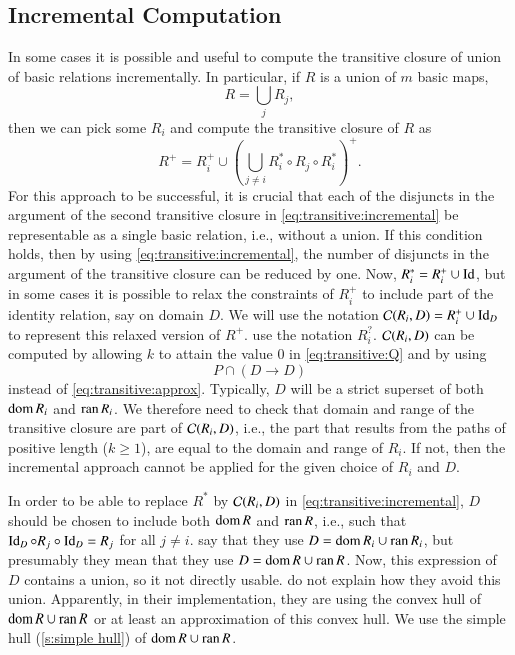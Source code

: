 \subsection{Incremental Computation}
\label{s:incremental}

In some cases it is possible and useful to compute the transitive closure
of union of basic relations incrementally.  In particular,
if $R$ is a union of $m$ basic maps,
$$
R = \bigcup_j R_j
,
$$
then we can pick some $R_i$ and compute the transitive closure of $R$ as
\begin{equation}
\label{eq:transitive:incremental}
R^+ = R_i^+ \cup
\left(
\bigcup_{j \ne i}
R_i^* \circ R_j \circ R_i^*
\right)^+
.
\end{equation}
For this approach to be successful, it is crucial that each
of the disjuncts in the argument of the second transitive
closure in \eqref{eq:transitive:incremental} be representable
as a single basic relation, i.e., without a union.
If this condition holds, then by using \eqref{eq:transitive:incremental},
the number of disjuncts in the argument of the transitive closure
can be reduced by one.
Now, $R_i^* = R_i^+ \cup \mathop{\rm Id}\nolimits$, but in some cases it is possible
to relax the constraints of $R_i^+$ to include part of the identity relation,
say on domain $D$.  We will use the notation
${\cal C}(R_i,D) = R_i^+ \cup \mathop{\rm Id}\nolimits_D$ to represent
this relaxed version of $R^+$.
 use the notation $R_i^?$.
${\cal C}(R_i,D)$ can be computed by allowing $k$ to attain
the value $0$ in \eqref{eq:transitive:Q} and by using
$$
P \cap \left(D \to D\right)
$$
instead of \eqref{eq:transitive:approx}.
Typically, $D$ will be a strict superset of both $\mathop{\rm dom}\nolimits R_i$
and $\mathop{\rm ran}\nolimits R_i$.  We therefore need to check that domain
and range of the transitive closure are part of ${\cal C}(R_i,D)$,
i.e., the part that results from the paths of positive length ($k \ge 1$),
are equal to the domain and range of $R_i$.
If not, then the incremental approach cannot be applied for
the given choice of $R_i$ and $D$.

In order to be able to replace $R^*$ by ${\cal C}(R_i,D)$
in \eqref{eq:transitive:incremental}, $D$ should be chosen
to include both $\mathop{\rm dom}\nolimits R$ and $\mathop{\rm ran}\nolimits R$, i.e., such
that $\mathop{\rm Id}\nolimits_D \circ R_j \circ \mathop{\rm Id}\nolimits_D = R_j$ for all $j\ne i$.
 say that they use
$D = \mathop{\rm dom}\nolimits R_i \cup \mathop{\rm ran}\nolimits R_i$, but presumably they mean that
they use $D = \mathop{\rm dom}\nolimits R \cup \mathop{\rm ran}\nolimits R$.
Now, this expression of $D$ contains a union, so it not directly usable.
 do not explain how they avoid this union.
Apparently, in their implementation,
they are using the convex hull of $\mathop{\rm dom}\nolimits R \cup \mathop{\rm ran}\nolimits R$
or at least an approximation of this convex hull.
We use the simple hull (\autoref{s:simple hull}) of $\mathop{\rm dom}\nolimits R \cup \mathop{\rm ran}\nolimits R$.

